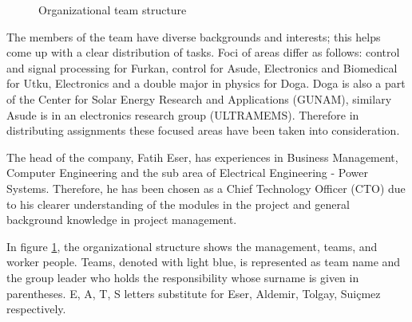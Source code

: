 \begin{figure}[htp]

\caption{Organizational team structure}
\label{fig:organizational_structure}
\end{figure}

The members of the team have diverse backgrounds and interests; this helps come up with a clear distribution of tasks. Foci of areas differ as follows: control and signal processing for Furkan, control for Asude, Electronics and Biomedical for Utku, Electronics and a double major in physics for Doga. Doga is also a part of the Center for Solar Energy Research and Applications (GUNAM), similary Asude is in an electronics research group (ULTRAMEMS). Therefore in distributing assignments these focused areas have been taken into consideration. 

The head of the company, Fatih Eser, has experiences in Business Management, Computer Engineering and the sub area of Electrical Engineering - Power Systems. Therefore, he has been chosen as a Chief Technology Officer (CTO) due to his clearer understanding of the modules in the project and general background knowledge in project management. 

In figure \ref{fig:organizational_structure}, the organizational structure shows the management, teams, and worker people. Teams, denoted with light blue, is represented as team name and the group leader who holds the responsibility whose surname is given in parentheses. E, A, T, S letters substitute for Eser, Aldemir, Tolgay, Suiçmez respectively.

